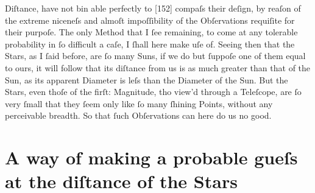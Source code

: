 \documentclass[letterpaper]{book}
\begin{document}
Diſtance, have not bin able perfectly to [152] compaſs their deſign, by
reaſon of the extreme niceneſs and almoſt impoſſibility of the Obſervations
requiſite for their purpoſe. The only Method that I ſee remaining, to come
at any tolerable probability in ſo difficult a caſe, I ſhall here make uſe
of. Seeing then that the Stars, as I ſaid before, are ſo many Suns, if we do
but ſuppoſe one of them equal to ours, it will follow that its diſtance from
us is as much greater than that of the Sun, as its apparent Diameter is leſs
than the Diameter of the Sun. But the Stars, even thoſe of the firſt:
Magnitude, tho view'd through a Teleſcope, are ſo very ſmall that they ſeem
only like ſo many ſhining Points, without any perceivable breadth. So that
ſuch Obſervations can here do us no good.


\section{A way of making a probable gueſs at the diſtance of the Stars}
\end{document}

